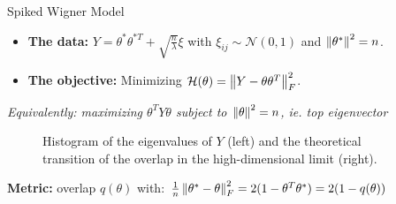 \documentclass[10pt]{beamer}
\begin{document}
\begin{frame}{Spiked Wigner Model}
  \begin{itemize}
    \item \textbf{The data:} $ Y = \theta^* \theta^{*T} + \sqrt{\frac{n}{\lambda}} \xi$ with $\xi_{ij} \sim \mathcal N(0, 1)$ and $\left\lVert\theta^*\right\rVert^2 = n$.
    \item \textbf{The objective:} Minimizing $\mathcal H(\theta) = \left\lVert Y-\theta \theta^T\right\rVert_F^2$.
  \end{itemize}
  \emph{Equivalently: maximizing $\theta^T Y \theta$ subject to $\left\lVert\theta\right\rVert^2 = n$, ie. top eigenvector}
  \begin{figure}[H]
      \centering
      \caption{Histogram of the eigenvalues of $Y$ (left) and the theoretical transition of the overlap in the high-dimensional limit (right).}
  \end{figure}
  
  \vspace*{-0.25cm}
  \textbf{Metric:} overlap $q(\theta)$ with: $\frac{1}{n} \left\lVert\theta^* - \theta\right\rVert_F^2 = 2(1 - \theta^T \theta^* ) = 2 (1 - q(\theta))$

\end{frame}
\end{document}
